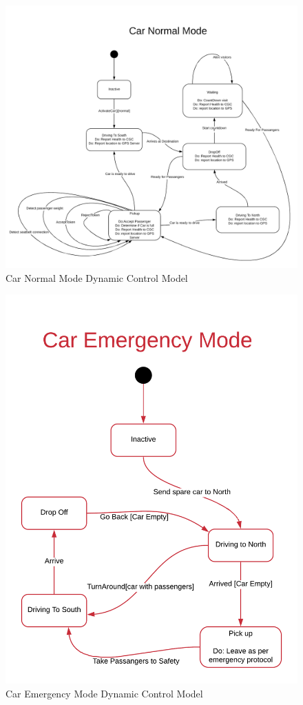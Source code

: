\documentclass[12pt]{article}
\begin{document}
    \begin{figure}[H]
 		\centerline{\includegraphics[scale=0.18]{CarNormalMode.png}}
 		\caption{Car Normal Mode Dynamic Control Model}
  		\label{fig:normal}
    \end{figure}

    \begin{figure}[H]
 		\centerline{\includegraphics[scale=0.25]{CarEmergencyMode.png}}
 		\caption{Car Emergency Mode Dynamic Control Model}
  		\label{fig:normal}
    \end{figure}
\end{document}
